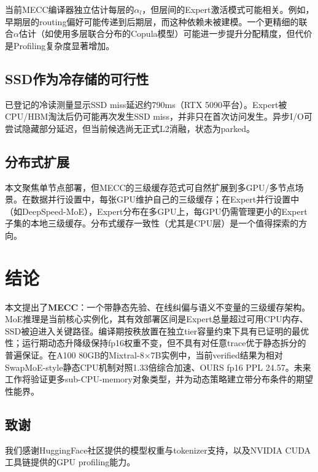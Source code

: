 \documentclass[11pt,a4paper]{article}
\begin{document}
当前MECC编译器独立估计每层的$\alpha_l$，但层间的Expert激活模式可能相关。例如，早期层的routing偏好可能传递到后期层，而这种依赖未被建模。一个更精细的联合$\alpha$估计（如使用多层联合分布的Copula模型）可能进一步提升分配精度，但代价是Profiling复杂度显著增加。

\subsection{SSD作为冷存储的可行性}

已登记的冷读测量显示SSD miss延迟约790ms（RTX 5090平台）。Expert被CPU/HBM淘汰后仍可能再次发生SSD miss，并非只在首次访问发生。异步I/O可尝试隐藏部分延迟，但当前候选尚无正式L2消融，状态为parked。

\subsection{分布式扩展}

本文聚焦单节点部署，但MECC的三级缓存范式可自然扩展到多GPU/多节点场景。在数据并行设置中，每张GPU维护自己的三级缓存；在Expert并行设置中（如DeepSpeed-MoE），Expert分布在多GPU上，每GPU仍需管理更小的Expert子集的本地三级缓存。分布式缓存一致性（尤其是CPU层）是一个值得探索的方向。

\section{结论}

本文提出了\textbf{MECC}：一个带静态先验、在线纠偏与语义不变量的三级缓存架构。MoE推理是当前核心实例化，其有效部署区间是Expert总量超过可用CPU内存、SSD被迫进入关键路径。编译期按秩放置在独立tier容量约束下具有已证明的最优性；运行期动态升降级保持fp16权重不变，但不具有对任意trace优于静态拆分的普遍保证。在A100 80GB的Mixtral-8×7B实例中，当前verified结果为相对SwapMoE-style静态CPU机制对照1.33倍综合加速、OURS fp16 PPL 24.57。未来工作将验证更多sub-CPU-memory对象类型，并为动态策略建立带分布条件的期望性能界。

\subsection*{致谢}

我们感谢HuggingFace社区提供的模型权重与tokenizer支持，以及NVIDIA CUDA工具链提供的GPU profiling能力。
\end{document}

